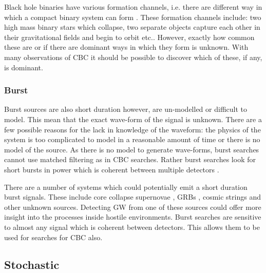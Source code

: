 Black hole binaries have various formation channels, i.e. there are different way in which a compact binary system can form \citep{}. 
These formation channels include: two high mass binary stars which collapse, two separate objects capture each other in their gravitational fields and begin to orbit etc..
However, exactly how common these are or if there are dominant ways in which they form is unknown. 
With many observations of \ac{CBC} it should be possible to discover which of these, if any, is dominant.


\subsubsection{\label{sources:transient:burst}Burst}

Burst sources are also short duration however, are un-modelled or difficult to model.
This mean that the exact wave-form of the signal is unknown.
There are a few possible reasons for the lack in knowledge of the waveform: the physics of the system is too complicated to model in a reasonable amount of time or there is no model of the source.
As there is no model to generate wave-forms, burst searches cannot use matched filtering as in \ac{CBC} searches.
Rather burst searches look for short bursts in power which is coherent between multiple detectors \citep{cornish2015BayeswaveBayesian,klimenko2008CoherentMethods}.

There are a number of systems which could potentially emit a short duration burst signals.
These include core collapse supernovae \citep{ott2008GravitationalWave}, \acp{GRB} \citep{aasi2014SearchGravitational}, cosmic strings \citep{damour2005GravitationalRadiation} and other unknown sources.
Detecting \ac{GW} from one of these sources could offer more insight into the processes inside hostile environments.
Burst searches are sensitive to almost any signal which is coherent between detectors. 
This allows them to be used for searches for \ac{CBC} also.



\subsection{Stochastic}

